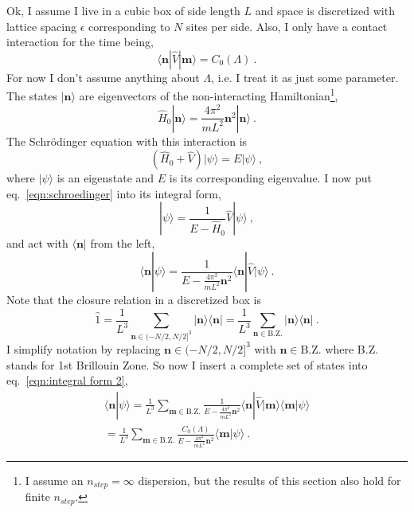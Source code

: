 \documentclass[11pt]{article}
\begin{document}
Ok, I assume I live in a cubic box of side length $L$ and space is discretized with lattice spacing $\epsilon$ corresponding to $N$ sites per side. Also, I only have a contact interaction for the time being,
\begin{equation}
\langle \bm n|\hat V|\bm m\rangle = C_0(\Lambda)\ .%
\end{equation}
For now I don't assume anything about $\Lambda$, i.e. I treat it as just some parameter.  The states $|\bm n\rangle$ are eigenvectors of the non-interacting Hamiltonian\footnote{I assume an $n_{step}=\infty$ dispersion, but the results of this section also hold for finite $n_{step}$.},
\begin{equation}
\hat H_0|\bm n\rangle = \frac{4\pi^2}{mL^2}\bm n^2|\bm n\rangle\ .
\end{equation}
The Schr\"odinger equation with this interaction is
\begin{equation}\label{eqn:schroedinger}
\left(\hat H_0+\hat V\right)|\psi\rangle = E|\psi\rangle\ ,
\end{equation}
where $|\psi\rangle$ is an eigenstate and $E$ is its corresponding eigenvalue.  I now put eq.~\eqref{eqn:schroedinger} into its integral form,
\begin{equation}\label{eqn:integral form 1}
|\psi\rangle = \frac{1}{E-\hat H_0}\hat V|\psi\rangle\ ,
\end{equation}
and act with $\langle \bm n|$ from the left,
\begin{equation}\label{eqn:integral form 2}
\langle \bm n|\psi\rangle = \frac{1}{E-\frac{4\pi^2}{mL^2}\bm n^2}\langle \bm n|\hat V|\psi\rangle\ .
\end{equation}
Note that the closure relation in a discretized box is
\begin{equation}\label{eqn:closure}
\hat 1=\frac{1}{L^3}\sum_{\bm n \in (-N/2,N/2]^3}|\bm n\rangle \langle \bm n|=\frac{1}{L^3}\sum_{\bm n \in \mathrm{B.Z.}}|\bm n\rangle \langle \bm n|\ .
\end{equation}
I simplify notation by replacing $\bm n \in (-N/2,N/2]^3$ with $\bm n \in\mathrm{B.Z.}$ where B.Z. stands for 1st Brillouin Zone. So now I insert a complete set of states into eq.~\eqref{eqn:integral form 2},
\begin{multline}\label{eqn:integral form 3}
\langle \bm n|\psi\rangle =\frac{1}{L^3} \sum_{\bm m\in\mathrm{B.Z.}}\frac{1}{E-\frac{4\pi^2}{mL^2}\bm n^2}\langle \bm n|\hat V|\bm m\rangle \langle \bm m|\psi\rangle\\
=\frac{1}{L^3} \sum_{\bm m\in\mathrm{B.Z.}}\frac{C_0(\Lambda)}{E-\frac{4\pi^2}{mL^2}\bm n^2} \langle \bm m|\psi\rangle\ .
\end{multline}
\end{document}
